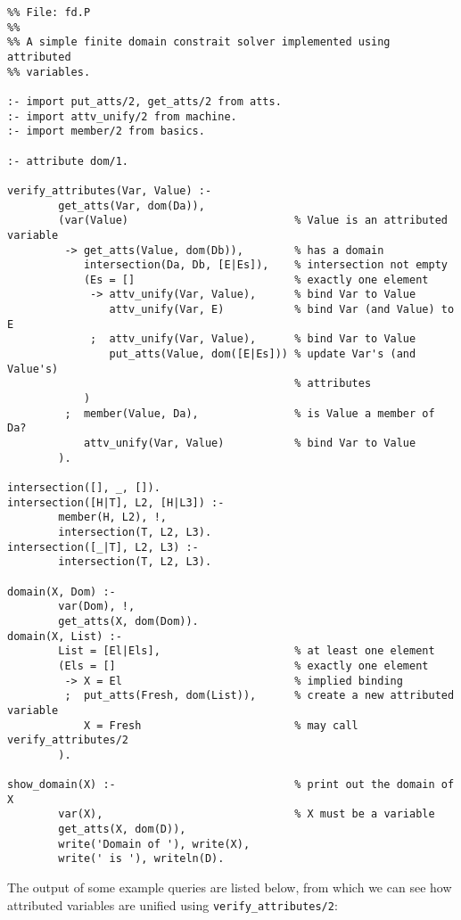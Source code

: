 \begin{small}
\begin{verbatim}
%% File: fd.P
%%
%% A simple finite domain constrait solver implemented using attributed
%% variables.  

:- import put_atts/2, get_atts/2 from atts.
:- import attv_unify/2 from machine.
:- import member/2 from basics.

:- attribute dom/1.

verify_attributes(Var, Value) :-
        get_atts(Var, dom(Da)),
        (var(Value)                          % Value is an attributed variable
         -> get_atts(Value, dom(Db)),        % has a domain
            intersection(Da, Db, [E|Es]),    % intersection not empty
            (Es = []                         % exactly one element
             -> attv_unify(Var, Value),      % bind Var to Value
                attv_unify(Var, E)           % bind Var (and Value) to E
             ;  attv_unify(Var, Value),      % bind Var to Value
                put_atts(Value, dom([E|Es])) % update Var's (and Value's)
                                             % attributes
            )
         ;  member(Value, Da),               % is Value a member of Da?
            attv_unify(Var, Value)           % bind Var to Value
        ).

intersection([], _, []).
intersection([H|T], L2, [H|L3]) :-
        member(H, L2), !,
        intersection(T, L2, L3).
intersection([_|T], L2, L3) :-
        intersection(T, L2, L3).

domain(X, Dom) :- 
        var(Dom), !, 
        get_atts(X, dom(Dom)). 
domain(X, List) :- 
        List = [El|Els],                     % at least one element 
        (Els = []                            % exactly one element
         -> X = El                           % implied binding 
         ;  put_atts(Fresh, dom(List)),      % create a new attributed variable
            X = Fresh                        % may call verify_attributes/2
        ).

show_domain(X) :-                            % print out the domain of X
        var(X),                              % X must be a variable
        get_atts(X, dom(D)),
        write('Domain of '), write(X),
        write(' is '), writeln(D).
\end{verbatim}
\end{small}

The output of some example queries are listed below, from which we can
see how attributed variables are unified using
\texttt{verify\_attributes/2}:

